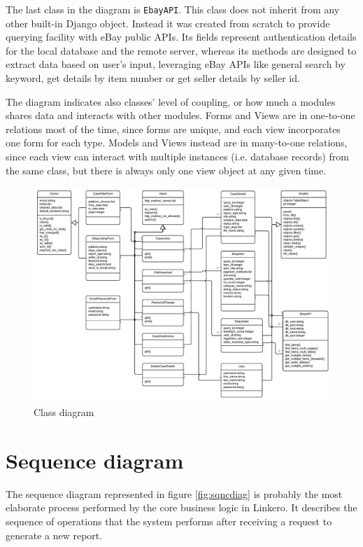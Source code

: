 The last class in the diagram is \texttt{EbayAPI}. This class does not inherit
from any other built-in Django object. Instead it was created from scratch to
provide querying facility with eBay public APIs. Its fields represent
authentication details for the local database and the remote server, whereas its
methods are designed to extract data based on user's input, leveraging eBay
APIs like general search by keyword, get details by item number or get seller
details by seller id.

The diagram indicates also classes' level of coupling, or how much a modules
shares data and interacts with other modules. Forms and Views are in one-to-one
relations most of the time, since forms are unique, and each view incorporates
one form for each type. Models and Views instead are in many-to-one relations,
since each view can interact with multiple instances (i.e. database records)
from the same class, but there is always only one view object at any given time.

\begin{figure}[H]
\centering
\includegraphics[angle=90, scale=0.9]{imgs/ClassDiag.pdf}
\caption{Class diagram}
\label{fig:clssdiag}
\end{figure}

\section{Sequence diagram}
The sequence diagram represented in figure \ref{fig:sqncdiag} is probably the
most elaborate process performed by the core business logic in Linkero. It
describes the sequence of operations that the system performs after receiving a
request to generate a new report.

